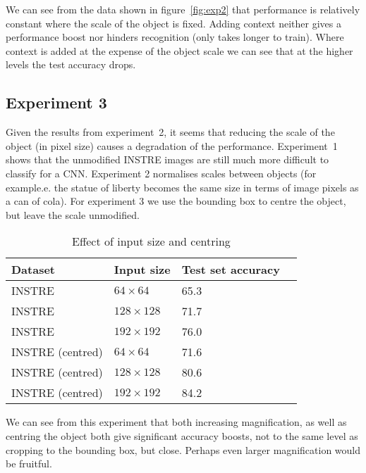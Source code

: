 \documentclass[conference]{IEEEtran}
\begin{document}
We can see from the data shown in figure~\ref{fig:exp2} that performance is relatively constant where the scale of the object is fixed. Adding context neither gives a performance boost nor hinders recognition (only takes longer to train). Where context is added at the expense of the object scale we can see that at the higher levels the test accuracy drops.


\subsection {Experiment 3}

Given the results from experiment~2, it seems that reducing the scale of the object (in pixel size) causes a degradation of the performance. Experiment~1 shows that the unmodified INSTRE images are still much more difficult to classify for a CNN. Experiment 2 normalises scales between objects (for example.e. the statue of liberty becomes the same size in terms of image pixels as a can of cola). For experiment 3 we use the bounding box to centre the object, but leave the scale unmodified.


\begin{table}[h]
  \centering
    \caption{Effect of input size and centring}
    
  \begin{tabular}{ l l l l }
    
    Dataset & Input size & Test set accuracy \\
    \toprule
    
    INSTRE &  $ 64 \times 64 $ & 65.3 \\
    INSTRE &  $ 128 \times 128 $  & 71.7 \\
    INSTRE &  $ 192 \times 192 $  & 76.0 \\
    
    \toprule
    INSTRE (centred) &  $ 64 \times 64 $ & 71.6 \\
    INSTRE (centred) &  $ 128 \times 128 $  & 80.6 \\
    INSTRE (centred) &  $ 192 \times 192 $  & 84.2 \\
    
    
    
    \bottomrule
  \end{tabular}
\label{fig:input_size}
\end{table}



We can see from this experiment that both increasing magnification, as well as centring the object both give significant accuracy boosts, not to the same level as cropping to the bounding box, but close. Perhaps even larger magnification would be fruitful. 
\end{document}
